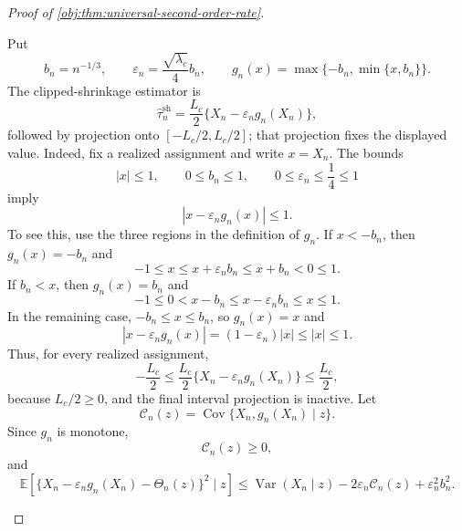 \documentclass[11pt]{article}
\begin{document}
\begin{proof}[Proof of \cref{obj:thm:universal-second-order-rate}]
\begin{enumerate}
Put
\[
b_n=n^{-1/3},
\qquad
\varepsilon_n=\frac{\sqrt{\lambda_c}}4 b_n,
\qquad
g_n(x)=\max\{-b_n,\min\{x,b_n\}\}.
\]
The clipped-shrinkage estimator is
\[
\widehat\tau_n^{\mathrm{sh}}
=
\frac{L_c}{2}\{X_n-\varepsilon_n g_n(X_n)\},
\]
followed by projection onto \([-L_c/2,L_c/2]\); that projection fixes the displayed value. Indeed, fix a realized assignment and write \(x=X_n\). The bounds
\[
|x|\le 1,\qquad 0\le b_n\le 1,\qquad 0\le\varepsilon_n\le \frac14\le 1
\]
imply
\[
|x-\varepsilon_n g_n(x)|\le 1.
\]
To see this, use the three regions in the definition of \(g_n\). If \(x<-b_n\), then \(g_n(x)=-b_n\) and
\[
-1\le x\le x+\varepsilon_n b_n\le x+b_n<0\le 1.
\]
If \(b_n<x\), then \(g_n(x)=b_n\) and
\[
-1\le 0<x-b_n\le x-\varepsilon_n b_n\le x\le 1.
\]
In the remaining case, \(-b_n\le x\le b_n\), so \(g_n(x)=x\) and
\[
|x-\varepsilon_n g_n(x)|=(1-\varepsilon_n)|x|\le |x|\le 1.
\]
Thus, for every realized assignment,
\[
-\frac{L_c}{2}
\le
\frac{L_c}{2}\{X_n-\varepsilon_n g_n(X_n)\}
\le
\frac{L_c}{2},
\]
because \(L_c/2\ge0\), and the final interval projection is inactive.
Let
\[
\mathcal C_n(z)=\operatorname{Cov}\{X_n,g_n(X_n)\mid z\}.
\]
Since \(g_n\) is monotone,
\[
\mathcal C_n(z)\ge 0,
\]
and
\[
\mathbb E\!\left[\{X_n-\varepsilon_n g_n(X_n)-\Theta_n(z)\}^2\mid z\right]
\le
\operatorname{Var}(X_n\mid z)-2\varepsilon_n\mathcal C_n(z)+\varepsilon_n^2b_n^2 .
\]


\end{enumerate}
\end{proof}
\end{document}
